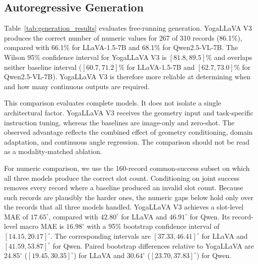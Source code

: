 \subsection{Autoregressive Generation}
\label{sec:generation_comparison}

Table~\ref{tab:generation_results} evaluates free-running generation.
YogaLLaVA V3 produces the correct number of numeric values for 267 of 310 records (86.1\%), compared with 66.1\% for LLaVA-1.5-7B and 68.1\% for Qwen2.5-VL-7B.
The Wilson 95\% confidence interval for YogaLLaVA V3 is $[81.8,89.5]\%$ and overlaps neither baseline interval ($[60.7,71.2]\%$ for LLaVA-1.5-7B and $[62.7,73.0]\%$ for Qwen2.5-VL-7B).
YogaLLaVA V3 is therefore more reliable at determining when and how many continuous outputs are required.

This comparison evaluates complete models.
It does not isolate a single architectural factor.
YogaLLaVA V3 receives the geometry input and task-specific instruction tuning, whereas the baselines are image-only and zero-shot.
The observed advantage reflects the combined effect of geometry conditioning, domain adaptation, and continuous angle regression.
The comparison should not be read as a modality-matched ablation.

For numeric comparison, we use the 160-record common-success subset on which all three models produce the correct slot count.
Conditioning on joint success removes every record where a baseline produced an invalid slot count.
Because such records are plausibly the harder ones, the numeric gaps below hold only over the records that all three models handled.
YogaLLaVA V3 achieves a slot-level MAE of $17.65^\circ$, compared with $42.80^\circ$ for LLaVA and $46.91^\circ$ for Qwen.
Its record-level macro MAE is $16.98^\circ$ with a 95\% bootstrap confidence interval of $[14.15,20.17]^\circ$.
The corresponding intervals are $[37.33,46.41]^\circ$ for LLaVA and $[41.59,53.87]^\circ$ for Qwen.
Paired bootstrap differences relative to YogaLLaVA are $24.85^\circ$ ($[19.45,30.35]^\circ$) for LLaVA and $30.64^\circ$ ($[23.70,37.83]^\circ$) for Qwen.

